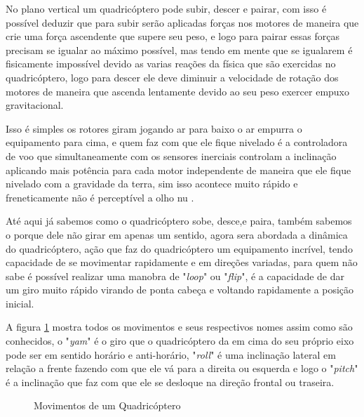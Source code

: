 No plano vertical um quadricóptero pode subir, descer e pairar, com isso é possível deduzir que para subir serão aplicadas forças nos motores de maneira que crie uma força ascendente que supere seu peso, e logo para pairar essas forças precisam se igualar ao máximo possível, mas tendo em mente que se igualarem é fisicamente impossível devido as varias reações da física que são exercidas no quadricóptero, logo para descer ele deve diminuir a velocidade de rotação dos motores de maneira que ascenda lentamente devido ao seu peso exercer empuxo gravitacional. 

Isso é simples os rotores giram jogando ar para baixo o ar empurra o equipamento para cima, e quem faz com que ele fique nivelado é a controladora de voo que simultaneamente com os sensores inerciais controlam a inclinação aplicando mais potência para cada motor independente de maneira que ele fique nivelado com a gravidade da terra, sim isso acontece muito rápido e freneticamente não é perceptível a olho nu \cite{forcecontrol}. 

Até aqui já sabemos como o quadricóptero sobe, desce,e paira, também sabemos o porque dele não girar em apenas um sentido, agora sera abordada a dinâmica do quadricóptero, ação que faz do quadricóptero um equipamento incrível, tendo capacidade de se movimentar rapidamente e em direções variadas, para quem não sabe é possível realizar uma manobra de "\textit{loop}" ou "\textit{flip}", é a capacidade de dar um giro muito rápido virando de ponta cabeça e voltando rapidamente a posição inicial. 

A figura \ref{fig:yamrollpitch} mostra todos os movimentos e seus respectivos nomes assim como são conhecidos, o "\textit{yam}" é o giro que o quadricóptero da em cima do seu próprio eixo pode ser em sentido horário e anti-horário, "\textit{roll}" é uma inclinação lateral em relação a frente fazendo com que ele vá para a direita ou esquerda e logo o "\textit{pitch}" é a inclinação que faz com que ele se desloque na direção frontal ou traseira. 

\begin{figure}[H]
	\centering
	\caption{Movimentos de um Quadricóptero}
	\fontsize{9pt}{12pt}\selectfont
	\def\svgwidth{15cm}
	
	\label{fig:yamrollpitch}
\end{figure}

